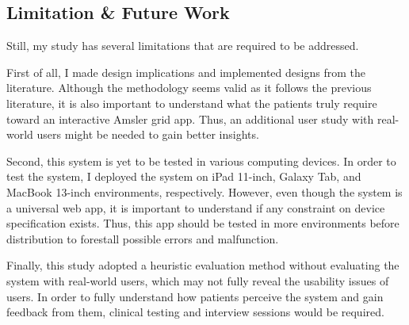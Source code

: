 \subsection{Limitation \& Future Work}

Still, my study has several limitations that are required to be addressed.

First of all, I made design implications and implemented designs from the literature. Although the methodology seems valid as it follows the previous literature, it is also important to understand what the patients truly require toward an interactive Amsler grid app. Thus, an additional user study with real-world users might be needed to gain better insights.

Second, this system is yet to be tested in various computing devices. In order to test the system, I deployed the system on iPad 11-inch, Galaxy Tab, and MacBook 13-inch environments, respectively. However, even though the system is a universal web app, it is important to understand if any constraint on device specification exists. Thus, this app should be tested in more environments before distribution to forestall possible errors and malfunction.

Finally, this study adopted a heuristic evaluation method without evaluating the system with real-world users, which may not fully reveal the usability issues of users. In order to fully understand how patients perceive the system and gain feedback from them, clinical testing and interview sessions would be required.